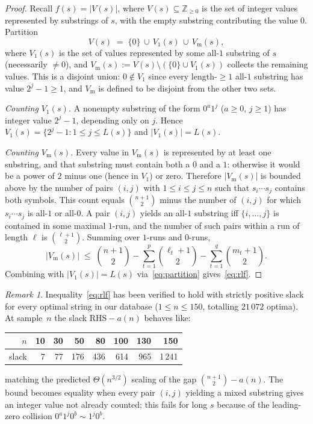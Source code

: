 ﻿\documentclass[11pt,a4paper]{article}
\theoremstyle{plain}
\theoremstyle{definition}
\theoremstyle{remark}
\newtheorem{remark}[theorem]{Remark}
\begin{document}
\begin{proof}
Recall $f(s)=|V(s)|$, where $V(s)\subseteq\mathbb Z_{\ge 0}$ is the
set of integer values represented by substrings of $s$, with the
empty substring contributing the value $0$.  Partition
\begin{equation}\label{eq:partition}
  V(s)\;=\;\{0\}\,\cup\,V_1(s)\,\cup\,V_{\mathrm m}(s),
\end{equation}
where $V_1(s)$ is the set of values represented by some all-$1$
substring of $s$ (necessarily $\ne 0$), and
$V_{\mathrm m}(s):=V(s)\setminus(\{0\}\cup V_1(s))$ collects the
remaining values.  This is a disjoint union: $0\notin V_1$ since
every length-$\ge 1$ all-$1$ substring has value $2^j-1\ge 1$, and
$V_{\mathrm m}$ is defined to be disjoint from the other two sets.

\smallskip\noindent\textit{Counting $V_1(s)$.}
A nonempty substring of the form $0^a 1^j$ ($a\ge 0$, $j\ge 1$) has
integer value $2^j-1$, depending only on $j$.  Hence
$V_1(s)=\{2^j-1:1\le j\le L(s)\}$ and $|V_1(s)|=L(s)$.

\smallskip\noindent\textit{Counting $V_{\mathrm m}(s)$.}
Every value in $V_{\mathrm m}(s)$ is represented by at least one
substring, and that substring must contain both a $0$ and a $1$:
otherwise it would be a power of $2$ minus one (hence in $V_1$) or
zero.  Therefore $|V_{\mathrm m}(s)|$ is bounded above by the number
of pairs $(i,j)$ with $1\le i\le j\le n$ such that
$s_i\cdots s_j$ contains both symbols.  This count equals
$\binom{n+1}{2}$ minus the number of $(i,j)$ for which
$s_i\cdots s_j$ is all-$1$ or all-$0$.  A pair $(i,j)$ yields an
all-$1$ substring iff $\{i,\ldots,j\}$ is contained in some maximal
$1$-run, and the number of such pairs within a run of length
$\ell$ is $\binom{\ell+1}{2}$.  Summing over $1$-runs and $0$-runs,
\[
  |V_{\mathrm m}(s)|\;\le\;
  \binom{n+1}{2}-\sum_{t=1}^{p}\binom{\ell_t+1}{2}
                -\sum_{t=1}^{q}\binom{m_t+1}{2}.
\]
Combining with $|V_1(s)|=L(s)$ via~\eqref{eq:partition}
gives~\eqref{eq:rlf}.
\end{proof}

\begin{remark}\label{rem:rlf-tight}
Inequality~\eqref{eq:rlf} has been verified to hold with strictly
positive slack for every optimal string in our database
($1\le n\le 150$, totalling $21\,072$ optima).  At sample~$n$ the
slack $\mathrm{RHS}-a(n)$ behaves like:
\begin{center}\small
\begin{tabular}{r r r r r r r r}
\toprule
$n$ & 10 & 30 & 50 & 80 & 100 & 130 & 150 \\
\midrule
slack & 7 & 77 & 176 & 436 & 614 & 965 & 1\,241 \\
\bottomrule
\end{tabular}
\end{center}
matching the predicted $\Theta(n^{3/2})$ scaling
of the gap $\binom{n+1}{2}-a(n)$.  The bound becomes equality when
every pair $(i,j)$ yielding a mixed substring gives an integer value
not already counted; this fails for long $s$ because of the
leading-zero collision $0^a 1^j 0^b\sim 1^j 0^b$.
\end{remark}
\end{document}
